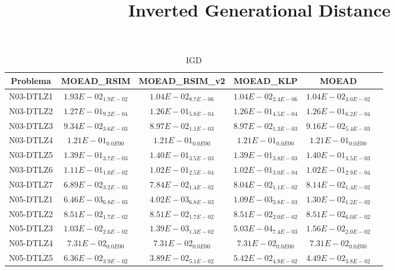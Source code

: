 \documentclass{article}
\title{Inverted Generational Distance}
\author{}
\begin{document}
\maketitle
\begin{table*}[ht!]
\scriptsize
\caption{IGD}
\centering\begin{tabular}{|c||c||c||c||c||c|} \hline
Problema &MOEAD_RSIM &MOEAD_RSIM_v2 &MOEAD_KLP &MOEAD\\\hline
N03-DTLZ1 &$1.93E-02_{1.9E-02}$ &\cellcolor{gray25}$1.04E-02_{8.7E-06}$ &\cellcolor{gray95}$1.04E-02_{2.4E-06}$ &$1.04E-02_{3.0E-02}$\\ 
\hline
N03-DTLZ2 &$1.27E-01_{9.2E-04}$ &\cellcolor{gray25}$1.26E-01_{5.8E-04}$ &\cellcolor{gray95}$1.26E-01_{4.5E-04}$ &$1.26E-01_{6.2E-04}$\\ 
\hline
N03-DTLZ3 &$9.34E-02_{3.6E-03}$ &\cellcolor{gray95}$8.97E-02_{1.1E-03}$ &\cellcolor{gray25}$8.97E-02_{1.3E-03}$ &$9.16E-02_{5.4E-03}$\\ 
\hline
N03-DTLZ4 &\cellcolor{gray95}$1.21E-01_{0.0E00}$ &\cellcolor{gray25}$1.21E-01_{0.0E00}$ &$1.21E-01_{0.0E00}$ &$1.21E-01_{0.0E00}$\\ 
\hline
N03-DTLZ5 &\cellcolor{gray25}$1.39E-01_{3.7E-03}$ &$1.40E-01_{3.5E-03}$ &\cellcolor{gray95}$1.39E-01_{3.8E-03}$ &$1.40E-01_{3.5E-03}$\\ 
\hline
N03-DTLZ6 &$1.11E-01_{1.0E-02}$ &\cellcolor{gray25}$1.02E-01_{2.5E-04}$ &$1.02E-01_{3.0E-04}$ &\cellcolor{gray95}$1.02E-01_{2.9E-04}$\\ 
\hline
N03-DTLZ7 &\cellcolor{gray95}$6.89E-02_{3.2E-03}$ &\cellcolor{gray25}$7.84E-02_{1.4E-02}$ &$8.04E-02_{1.1E-02}$ &$8.14E-02_{1.4E-02}$\\ 
\hline
N05-DTLZ1 &$6.46E-03_{6.8E-03}$ &\cellcolor{gray25}$4.02E-03_{6.8E-03}$ &\cellcolor{gray95}$1.09E-03_{3.8E-03}$ &$1.30E-02_{1.2E-02}$\\ 
\hline
N05-DTLZ2 &\cellcolor{gray95}$8.51E-02_{1.7E-02}$ &\cellcolor{gray25}$8.51E-02_{1.7E-02}$ &$8.51E-02_{2.0E-02}$ &$8.51E-02_{6.0E-02}$\\ 
\hline
N05-DTLZ3 &$1.03E-02_{2.6E-02}$ &\cellcolor{gray25}$1.39E-03_{1.3E-02}$ &\cellcolor{gray95}$5.03E-04_{7.4E-03}$ &$1.56E-02_{2.0E-02}$\\ 
\hline
N05-DTLZ4 &\cellcolor{gray95}$7.31E-02_{0.0E00}$ &\cellcolor{gray25}$7.31E-02_{0.0E00}$ &$7.31E-02_{0.0E00}$ &$7.31E-02_{0.0E00}$\\ 
\hline
N05-DTLZ5 &$6.36E-02_{3.9E-02}$ &\cellcolor{gray95}$3.89E-02_{5.1E-02}$ &$5.42E-02_{4.9E-02}$ &\cellcolor{gray25}$4.49E-02_{3.8E-02}$\\ 

\end{tabular}
\end{table*}
\end{document}
